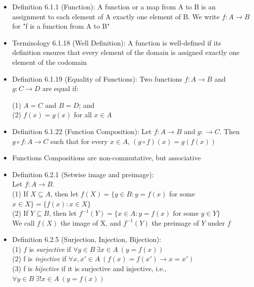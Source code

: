 \documentclass{article}
\begin{document}
\begin{itemize}
    \item Definition 6.1.1 (Function): A function or a map from A to B is an assignment to each element of A exactly one element of B. We write $f: A \xrightarrow{} B$ for "f is a function from A to B"
    \item Terminology 6.1.18 (Well Definition): A function is well-defined if its definition ensures that every element of the domain is assigned exactly one element of the codomain
    \item Definition 6.1.19 (Equality of Functions): Two functions $f: A \xrightarrow{} B$ and $g: C \xrightarrow{} D$ are equal if:
        \begin{center}
            (1) $A = C$ and $B = D$; and 
            \\ (2) $f(x) = g(x)$ for all $x \in A$
        \end{center}
    \item Definition 6.1.22 (Function Composition): Let $f: A \xrightarrow{} B$ and $g: \xrightarrow{} C$. Then $g \circ f: A \xrightarrow{} C$ such that for every $x \in A$, $(g \circ f)(x) = g(f(x))$
    \item Functions Compositions are non-commutative, but associative
    \item Definition 6.2.1 (Setwise image and preimage):
        \\ Let $f: A \xrightarrow{} B$.
        \\ \hspace*{3mm} (1) If $X \subseteq A$, then let $f(X) = \{y \in B: y = f(x)$ for some $x \in X\} = \{f(x): x \in X\}$
        \\ \hspace*{3mm} (2) If $Y \subseteq B$, then let $f^{-1}(Y) = \{x \in A: y=f(x)$ for some $y \in Y\}$
        \\ We call $f(X)$ the image of X, and $f^{-1}(Y)$ the preimage of $Y$ under $f$
    \item Definition 6.2.5 (Surjection, Injection, Bijection):
        \\ \hspace*{3mm} (1) $f$ is \emph{surjective} if $\forall y \in B \ \exists x \in A \ (y = f(x))$
        \\ \hspace*{3mm} (2) f is \emph{injective} if $\forall x,x' \in A \ (f(x) = f(x') \xrightarrow{} x = x')$
        \\ \hspace*{3mm} (3) f is \emph{bijective} if it is surjective and injective, i.e., $\forall y \in B \ \exists! x \in A \ (y=f(x))$ 

\end{itemize}
\end{document}
